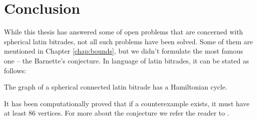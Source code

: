 \chapter*{Conclusion}

While this thesis has answered some of open problems that are concerned with spherical latin bitrades, not all such problems have been solved. Some of them are mentioned in Chapter \ref{chap:bounds}, but we didn't formulate the most famous one -- the Barnette's conjecture. In language of latin bitrades, it can be stated as follows:

\begin{conj*}[Barnette]
The graph of a spherical connected latin bitrade has a Hamiltonian cycle.
\end{conj*}%

\noindent
It has been computationally proved that if a counterexample exists, it must have at least 86 vertices. For more about the conjecture we refer the reader to \cite{Hertel05}.

\bigskip

